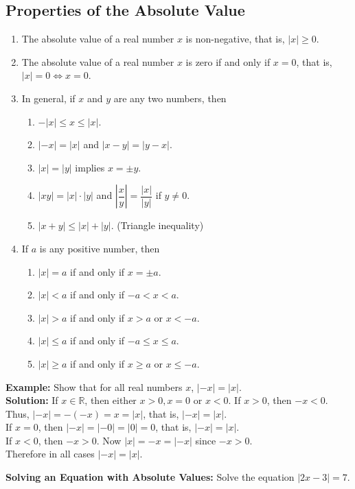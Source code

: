 \documentclass[titlepage,a4paper,12pt]{report}
\begin{document}
 \subsection{Properties of the Absolute Value }
 \begin{enumerate}
 \item The absolute value of a real number $x$ is non-negative, that is, $|x|\geq 0$.
 \item The absolute value of a real number $x$ is zero if and only if $x=0$, that is, $|x|=0\Longleftrightarrow x=0$.
 \item In general, if $x$ and $y$ are any two numbers, then 
 \begin{enumerate}
 \item $-|x|\leq x\leq |x|$.
 \item $|-x|=|x|$ and $|x-y|=|y-x|$.
 \item $|x|=|y|$ implies $x=\pm y$.
 \item $|xy|=|x|\cdot |y|$ and $\left|\dfrac{x}{y}\right|=\dfrac{|x|}{|y|}$ if $y\neq 0$.
 \item $|x+y|\leq |x|+|y|$. (Triangle inequality)
 \end{enumerate}
 \item If $a$ is any positive number, then 
 \begin{enumerate}
 \item $|x|=a$ if and only if $x=\pm a$.
 \item $|x|<a$ if and only if $-a<x<a$.
 \item $|x|>a$ if and only if $x>a$ or $x<-a$.
 \item $|x|\leq a$ if and only if $-a\leq x\leq a$.
 \item $|x|\geq a$ if and only if $x\geq a$ or $x\leq -a$.
 \end{enumerate}
 \end{enumerate}
 \textbf{Example:} Show that for all real numbers $x$, $|-x|=|x|$.\\
 \textbf{Solution:} If $x\in \mathbb{R}$, then either $x>0, x=0$ or $x<0$. If $x>0$, then $-x<0$. Thus, $|-x|=-(-x)=x=|x|$, that is, $|-x|=|x|$. \\
If $x=0$, then $|-x|=|-0|=|0|=0$, that is, $|-x|=|x|$.\\
If $x<0$, then $-x>0$. Now $|x|=-x=|-x|$ since $-x>0$.\\
Therefore in all cases $|-x|=|x|$.

\noindent \textbf{Solving an Equation with Absolute Values:} Solve the equation $|2x-3|=7$.
\end{document}
